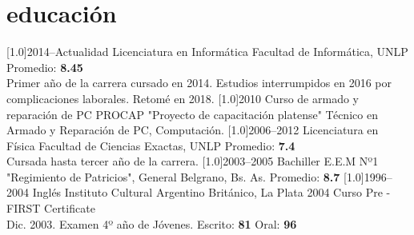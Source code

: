 \documentclass[espanol]{cv-style}     %
\begin{document}
\section{educación}
  \vspace{-0.2cm}
\begin{entrylist}
\entry
{\scalebox{.8}[1.0]{2014--Actualidad}}
{Licenciatura en Informática \small {}}
{Facultad de Informática, UNLP}
{Promedio: \textbf{8.45}\\
{\small Primer año de la carrera cursado en 2014. Estudios interrumpidos en 2016 por complicaciones laborales. Retomé en 2018.
}}%
\entry
{\scalebox{.8}[1.0]{2010}}
{Curso de armado y reparación de PC}
{PROCAP "Proyecto de capacitación platense"}
{\small{Técnico en Armado y Reparación de PC, Computación.
}}
\entry
{\scalebox{.8}[1.0]{2006--2012}}
{Licenciatura en Física \small {}}
{Facultad de Ciencias Exactas, UNLP}
{\small Promedio: \textbf{7.4}\\
{Cursada hasta tercer año de la carrera.
}}
\entry
{\scalebox{.8}[1.0]{2003--2005}}
{Bachiller }
{{E.E.M Nº1 "Regimiento de Patricios", General Belgrano, Bs. As.}}
{\small Promedio: \textbf{8.7}
}
\entry
{\scalebox{.8}[1.0]{1996--2004}}
{Inglés}
{{Instituto Cultural Argentino Británico, La Plata}}
{\small
2004 Curso Pre - FIRST Certificate \\
Dic. 2003. Examen 4º año de Jóvenes. Escrito: \textbf{81} Oral: \textbf{96}
}

\end{entrylist}
\vspace{-0.3cm}
\end{document}
